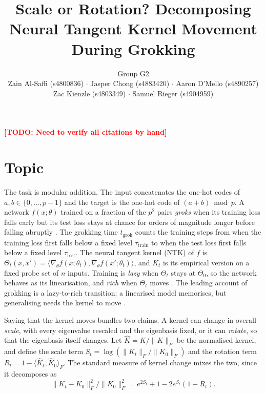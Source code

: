 \documentclass[a4paper,11pt]{article} %
\newcommand{\TODO}[1]{\textcolor{red}{\textbf{[TODO: #1]}}}
\newcommand{\Kh}{\widehat{K}}
\newcommand{\Fnorm}[1]{\lVert #1 \rVert_F}
\newcommand{\tgrok}{t_{\mathrm{grok}}}
\begin{document}
\title{Scale or Rotation? Decomposing Neural Tangent Kernel Movement During Grokking}
\author{Group G2 \\
Zain Al-Saffi (s4800836) $\cdot$
Jasper Chong (s4883420) $\cdot$
Aaron D'Mello (s4890257) \\
Zac Kienzle (s4803349) $\cdot$ Samuel Rieger (s4904959)}

\date{}
\maketitle
\TODO{Need to verify all citations by hand}
\section{Topic}

The task is modular addition. The input concatenates the
one-hot codes of $a,b\in\{0,\dots,p-1\}$ and the target is the one-hot code of
$(a+b)\bmod p$. A network $f(x;\theta)$
trained on a fraction of the $p^2$ pairs \emph{groks} when its training loss
falls early but its test loss stays at chance for orders of magnitude longer
before falling abruptly \citep{power2022grokking}. The grokking time $\tgrok$ counts
the training steps from when the training loss first falls below a fixed level
$\tau_{\mathrm{train}}$ to when the test loss first falls below a fixed level
$\tau_{\mathrm{test}}$. The neural tangent kernel (NTK)
of $f$ is
$\Theta_t(x,x')=\langle\nabla_\theta f(x;\theta_t),\nabla_\theta f(x';\theta_t)\rangle$,
and $K_t$ is its empirical version on a fixed probe set of $n$ inputs.
Training is \emph{lazy} when $\Theta_t$ stays at $\Theta_0$, so the network
behaves as its linearisation, and \emph{rich} when $\Theta_t$ moves
\citep{jacot2018ntk,chizat2019lazy}. The leading account of grokking is a
lazy-to-rich transition: a linearised model memorises, but generalising needs
the kernel to move \citep{kumar2024grokking}.

Saying that the kernel moves bundles two claims. A
kernel can change in overall \emph{scale}, with every eigenvalue rescaled and
the eigenbasis fixed, or it can \emph{rotate}, so that the eigenbasis itself
changes. Let $\Kh=K/\Fnorm{K}$ be the normalised kernel, and define the scale
term $S_t=\log(\Fnorm{K_t}/\Fnorm{K_0})$ and the rotation term
$R_t=1-\langle\Kh_t,\Kh_0\rangle_F$. The standard measure of kernel change
mixes the two, since it decomposes as
\begin{equation}
  \Fnorm{K_t-K_0}^2\big/\Fnorm{K_0}^2 = e^{2S_t}+1-2e^{S_t}(1-R_t).
  \label{eq:decomp}
\end{equation}
\end{document}
